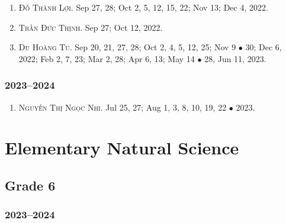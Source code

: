 \documentclass{article}
\begin{document}
\begin{enumerate}
	\item \textsc{Đỗ Thành Lợi.} {\sf[In]} Sep 27, 28; Oct 2, 5, 12, 15, 22; Nov 13; Dec 4, 2022. {\sf[Out]}
	\item \textsc{Trần Đức Thịnh.} {\sf[In]} Sep 27; Oct 12, 2022. {\sf[Out]}
	\item \textsc{Du Hoàng Tú.} {\sf[In]} Sep 20, 21, 27, 28; Oct 2, 4, 5, 12, 25; Nov 9 $\bullet$ 30; Dec 6, 2022; Feb 2, 7, 23; Mar 2, 28; Apr 6, 13; May 14 $\bullet$ 28, Jun 11, 2023. {\sf[Out]}
\end{enumerate}

\subsubsection{2023--2024}

\begin{enumerate}
	\item \textsc{Nguyễn Thị Ngọc Nhi.} {\sf[In]} Jul 25, 27; Aug 1, 3, 8, 10, 19, 22 $\bullet$ 2023. {\sf[Out]}
\end{enumerate}


\section{Elementary Natural Science}

\subsection{Grade 6}

\subsubsection{2023--2024}
\end{document}
